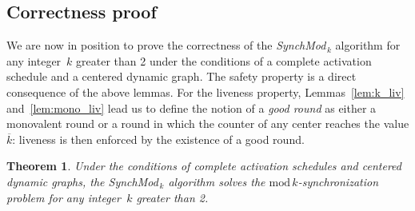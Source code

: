 \documentclass{article}
\newtheorem{theorem}{Theorem}
\newcommand{\SM}{{\em SynchMod}$_{\,k}$ }
\begin{document}
\subsection{Correctness proof}

We are now in position to prove the correctness of the \SM algorithm for any integer~$k$ greater than 2
	under the conditions of a complete activation schedule and a  centered dynamic graph.
The safety property is a direct consequence of the above lemmas.
For the liveness property, Lemmas~\ref{lem:k_liv} and~\ref{lem:mono_liv} lead us to define the notion 
	of a \emph{good round}  as either a monovalent round or a round in which  the  counter of any 
	center reaches  the value $\overline{k}$:
	liveness is then enforced by the existence of a good round.

\begin{theorem}\label{thm:k>2}
Under the conditions of complete activation schedules and centered dynamic graphs,
	the \SM algorithm solves the $\mathrm{mod}\,k$-synchronization problem for any integer~$k$ greater than 2.
\end{theorem}
\end{document}
